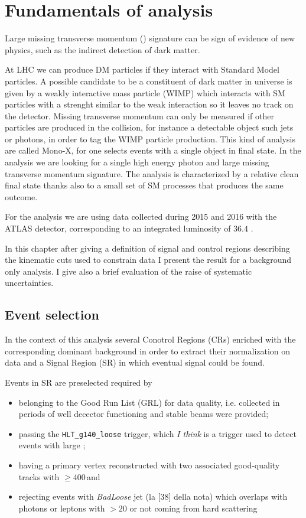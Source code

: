\chapter{Fundamentals of \mph analysis}
Large missing transverse momentum (\met) signature can be sign of evidence of new physics, such as the indirect detection of dark matter.

At LHC we can produce DM particles if they interact with Standard Model particles. A possible candidate to be a constituent of dark matter in universe is given by a weakly interactive mass particle (WIMP) which interacts with SM particles with a strenght similar to the weak interaction so it leaves no track on the detector. Missing transverse momentum can only be measured  if other particles are produced in the collision, for instance a detectable object such jets or photons, in order to tag the WIMP particle production. This kind of analysis are called Mono-X, for one selects events with a single object in final state. In the \mph analysis we are looking for a single high energy photon and large missing transverse momentum signature. The \mph analysis is characterized by a relative clean final state thanks also to a small set of SM processes that produces the same outcome.

For the analysis we are using data collected during 2015 and 2016 with the ATLAS detector, corresponding to an integrated luminosity of $36.4$ \ifb.

In this chapter after giving a definition of signal and control regions describing the kinematic cuts used to constrain data I present the result for a background only analysis. I give also a brief evaluation of the raise of systematic uncertainties.

\section{Event selection}
In the context of this \mph analysis several Conotrol Regions (CRs) enriched with the corresponding dominant background in order to extract their normalization on data and a Signal Region (SR) in which eventual signal could be found.

Events in SR are preselected required by
\begin{itemize}%
\item belonging to the Good Run List (GRL) for data quality, i.e. collected in periods of well decector functioning and stable beams were provided;
\item passing the  \verb!HLT_g140_loose! trigger, which {\itshape I think} is a trigger used to detect events with large \met; 
\item having a primary vertex reconstructed with two associated good-quality tracks with \pt $\ge 400 \,$\MeV and 
\item rejecting events with {\itshape BadLoose} jet (la [38] della nota) which overlaps with photons or leptons with \pt$> 20$ \GeV or not coming from hard scattering
\end{itemize}

